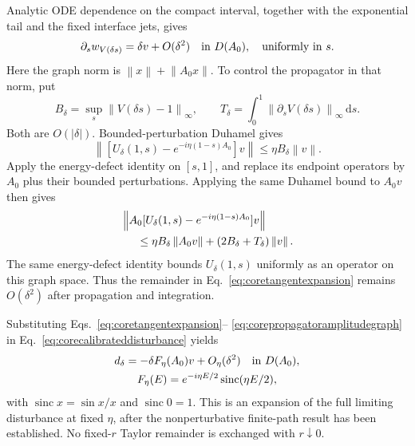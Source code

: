 \documentclass[aps,pra,reprint,superscriptaddress,longbibliography]{revtex4-2}
\newcommand{\dd}{\mathrm d}
\newcommand{\norm}[1]{\left\lVert#1\right\rVert}
\newcommand{\sinc}{\operatorname{sinc}}
\begin{document}
Analytic ODE dependence on the compact interval, together with the
exponential tail and the fixed interface jets, gives
\begin{equation}
 \partial_sw_{V(\delta s)}=\delta v+O(\delta^2)
 \quad\hbox{in }D(A_0),\quad\hbox{uniformly in }s.
 \label{eq:coretangentexpansion}
\end{equation}
Here the graph norm is $\norm x+\norm{A_0x}$. To control the
propagator in that norm, put
\begin{equation}
 B_\delta=\sup_s\norm{V(\delta s)-1}_\infty,
 \qquad T_\delta=\int_0^1
        \norm{\partial_sV(\delta s)}_\infty\,\dd s.
 \label{eq:coreamplitudebudgets}
\end{equation}
Both are $O(|\delta|)$. Bounded-perturbation Duhamel gives
\begin{equation}
 \norm{[U_\delta(1,s)-e^{-i\eta(1-s)A_0}]v}
                 \le\eta B_\delta\norm v.
 \label{eq:corepropagatoramplitudenorm}
\end{equation}
Apply the energy-defect identity on $[s,1]$, and replace its endpoint
operators by $A_0$ plus their bounded perturbations. Applying the
same Duhamel bound to $A_0v$ then gives
\begin{align}
 &\norm{A_0[U_\delta(1,s)-e^{-i\eta(1-s)A_0}]v}\nonumber\\
 &\hspace{5mm}\le\eta B_\delta\norm{A_0v}
              +(2B_\delta+T_\delta)\norm v.
 \label{eq:corepropagatoramplitudegraph}
\end{align}
The same energy-defect identity bounds $U_\delta(1,s)$ uniformly
as an operator on this graph space. Thus the remainder in
Eq.~\eqref{eq:coretangentexpansion} remains $O(\delta^2)$ after
propagation and integration.

Substituting Eqs.~\eqref{eq:coretangentexpansion}--
\eqref{eq:corepropagatoramplitudegraph} in
Eq.~\eqref{eq:corecalibrateddisturbance} yields
\begin{equation}
 \begin{gathered}
 d_\delta=-\delta F_\eta(A_0)v+O_\eta(\delta^2)
     \quad\hbox{in }D(A_0),\\
 F_\eta(E)=e^{-i\eta E/2}\sinc(\eta E/2),
 \end{gathered}
 \label{eq:coregraphfilter}
\end{equation}
with $\sinc x=\sin x/x$ and $\sinc0=1$. This is an expansion of
the full limiting disturbance at fixed $\eta$, after the
nonperturbative finite-path result has been established. No
fixed-$r$ Taylor remainder is exchanged with $r\downarrow0$.
\end{document}

